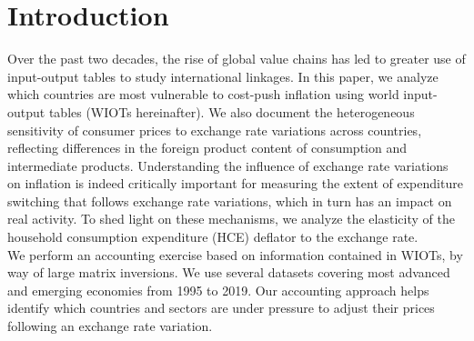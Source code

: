 \documentclass[11pt,a4paper]{paper} %
\begin{document}

\newpage 
\section*{Introduction}

Over the past two decades, the rise of global value chains has led to greater use of input-output tables to study international linkages. 
In this paper, we analyze which countries are most vulnerable to cost-push inflation using world input-output tables (WIOTs hereinafter). 
We also document the heterogeneous sensitivity of consumer prices to exchange rate variations across countries, reflecting differences in the foreign product content of consumption and intermediate products. 
Understanding the influence of exchange rate variations on inflation is indeed critically important for measuring the extent of expenditure switching that follows exchange rate variations, which in turn has an impact on real activity.
To shed light on these mechanisms, we analyze the elasticity of the household consumption expenditure (HCE) deflator to the exchange rate.\\
We perform an accounting exercise based on information contained in WIOTs, by way of large matrix inversions.
We use several datasets covering most advanced and emerging economies from 1995 to 2019. 
Our accounting approach helps identify which countries and sectors are under pressure to adjust their prices following an exchange rate variation.\\
\end{document}
